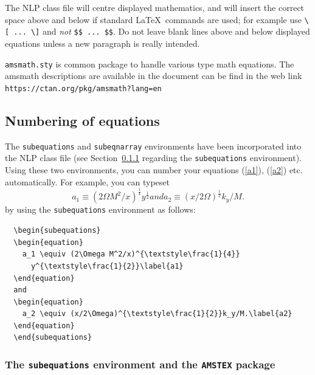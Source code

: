 \documentclass{CUP-JNL-NLP}
\begin{document}
The NLP class file will centre displayed mathematics, and will insert the
correct space above and below if standard \LaTeX\ commands are used; for
example use \verb"\[ ... \]" and \emph{not} \verb"$$ ... $$". Do not leave
blank lines above and below displayed equations unless a new paragraph is
really intended.

\verb"amsmath.sty" is common package to handle various type math equations. The amsmath descriptions are available in the document can be find in the web link \verb"https://ctan.org/pkg/amsmath?lang=en"

\subsection{Numbering of equations}

The \verb"subequations" and \verb"subeqnarray" environments have been
incorporated into the NLP class file (see Section~\ref{sub:amstex} regarding
the \verb"subequations" environment). Using these two environments,
you can number your equations (\ref{a1}), (\ref{a2}) etc. automatically.
For example, you can typeset
  \begin{subequations}
  \begin{equation}
    a_1 \equiv (2\Omega M^2/x)^{\textstyle\frac{1}{4}}
      y^{\textstyle\frac{1}{2}}\label{a1}
  \end{equation}
  and
  \begin{equation}
    a_2 \equiv (x/2\Omega)^{\textstyle\frac{1}{2}}k_y/M.\label{a2}
  \end{equation}
  \end{subequations}
by using the \verb"subequations" environment as follows:
%
\begin{verbatim}
  \begin{subequations}
  \begin{equation}
    a_1 \equiv (2\Omega M^2/x)^{\textstyle\frac{1}{4}}
      y^{\textstyle\frac{1}{2}}\label{a1}
  \end{equation}
  and
  \begin{equation}
    a_2 \equiv (x/2\Omega)^{\textstyle\frac{1}{2}}k_y/M.\label{a2}
  \end{equation}
  \end{subequations}
\end{verbatim}

\subsubsection{The \texttt{subequations} environment and the
  \texttt{AMSTEX} package} \label{sub:amstex}
\end{document}
